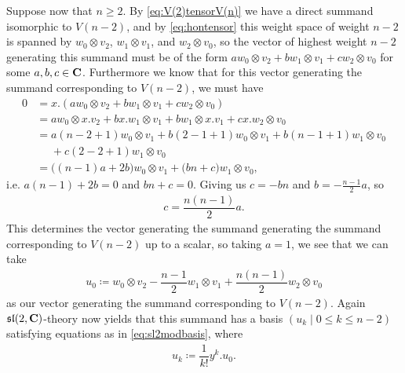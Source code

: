Suppose now that $n\geq 2$. By \cref{eq:V(2)tensorV(n)} we have a direct summand isomorphic to $V(n-2)$, and by \cref{eq:hontensor} this weight space of weight $n-2$ is spanned by $w_0\otimes v_2$, $w_1\otimes v_1$, and $w_2\otimes v_0$, so the vector of highest weight $n-2$ generating this summand must be of the form $aw_0\otimes v_2 + bw_1\otimes v_1 + cw_2\otimes v_0$ for some $a,b,c\in\mathbf{C}$. Furthermore we know that for this vector generating the summand corresponding to $V(n-2)$, we must have
\begin{align*}
  0 &= x.(aw_0\otimes v_2 + bw_1\otimes v_1 + cw_2\otimes v_0) \\
    &= aw_0\otimes x.v_2 + bx.w_1\otimes v_1 + bw_1\otimes x.v_1 + cx.w_2\otimes v_0 \\
    &= a(n-2+1)w_0\otimes v_1 + b(2-1+1)w_0\otimes v_1 + b(n-1+1)w_1\otimes v_0 \\
  &\phantom{{}={}}{} + c(2-2+1)w_1\otimes v_0 \\
    &= \bigl((n-1)a + 2b\bigr)w_0\otimes v_1 + \bigl(bn + c\bigr)w_1\otimes v_0,
\end{align*}
i.e. $a(n-1)+2b=0$ and $bn+c=0$. Giving us $c=-bn$ and $b=-\tfrac{n-1}{2}a$, so
\begin{align*}
  c=\dfrac{n(n-1)}{2}a.
\end{align*}
This determines the vector generating the summand generating the summand corresponding to $V(n-2)$ up to a scalar, so taking $a=1$, we see that we can take
\begin{align*}
  u_0 \coloneqq w_0\otimes v_2 - \dfrac{n-1}{2}w_1\otimes v_1 + \dfrac{n(n-1)}{2}w_2\otimes v_0
\end{align*}
as our vector generating the summand corresponding to $V(n-2)$. Again $\mathfrak{sl}(2,\mathbf{C})$-theory now yields that this summand has a basis $(u_k \mid 0\leq k\leq n-2)$ satisfying equations as in \cref{eq:sl2modbasis}, where 
\begin{align*}
  u_k \coloneqq \dfrac{1}{k!}y^k.u_0.
\end{align*}
